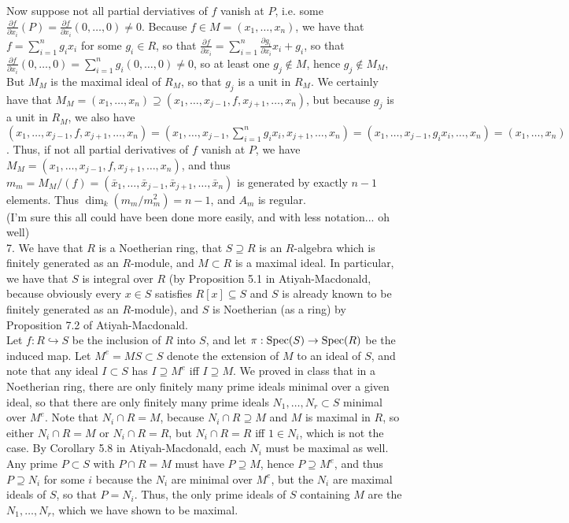 \documentclass[11pt]{article}
\begin{document}
Now suppose not all partial derviatives of $f$ vanish at $P$, i.e. some $\frac{\partial f}{\partial x_i}(P)=\frac{\partial f}{\partial x_i}(0,\ldots,0)\neq0$. Because $f\in M=(x_1,\ldots,x_n)$, we have that $f=\sum_{i=1}^n g_ix_i$ for some $g_i\in R$, so that $\frac{\partial f}{\partial x_i}=\sum_{i=1}^n \frac{\partial g_i}{\partial x_i}x_i + g_i$, so that $\frac{\partial f}{\partial x_i}(0,\ldots,0)=\sum_{i=1}^n g_i(0,\ldots,0)\neq0$, so at least one $g_j\notin M$, hence $g_j\notin M_M$, But $M_M$ is the maximal ideal of $R_M$, so that $g_j$ is a unit in $R_M$. We certainly have that $M_M=(x_1,\ldots,x_n)\supseteq (x_1,\ldots,x_{j-1},f,x_{j+1},\ldots,x_n)$, but because $g_j$ is a unit in $R_M$, we also have $(x_1,\ldots,x_{j-1},f,x_{j+1},\ldots,x_n)=(x_1,\ldots,x_{j-1},\sum_{i=1}^n g_ix_i,x_{j+1},\ldots,x_n)=(x_1,\ldots,x_{j-1},g_ix_i,\ldots,x_n)=(x_1,\ldots,x_n)$. Thus, if not all partial derivatives of $f$ vanish at $P$, we have $M_M=(x_1,\ldots,x_{j-1},f,x_{j+1},\ldots,x_n)$, and thus $m_m=M_M/(f)=(\bar{x}_1,\ldots,\bar{x}_{j-1},\bar{x}_{j+1},\ldots,\bar{x}_n)$ is generated by exactly $n-1$ elements. Thus $\dim_k(m_m/m_m^2)=n-1$, and $A_m$ is regular. \\

(I'm sure this all could have been done more easily, and with less notation... oh well)\\

\num{7.} We have that $R$ is a Noetherian ring, that $S\supseteq R$ is an $R$-algebra which is finitely generated as an $R$-module, and $M\subset R$ is a maximal ideal. In particular, we have that $S$ is integral over $R$ (by Proposition 5.1 in Atiyah-Macdonald, because obviously every $x\in S$ satisfies $R[x]\subseteq S$ and $S$ is already known to be finitely generated as an $R$-module), and $S$ is Noetherian (as a ring) by Proposition 7.2 of Atiyah-Macdonald. \\

Let $f:R\hookrightarrow S$ be the inclusion of $R$ into $S$, and let $\pi:\operatorname{Spec}(S)\rightarrow\operatorname{Spec}(R)$ be the induced map. Let $M^e=MS\subset S$ denote the extension of $M$ to an ideal of $S$, and note that any ideal $I\subset S$ has $I\supseteq M^e$ iff $I\supseteq M$. We proved in class that in a Noetherian ring, there are only finitely many prime ideals minimal over a given ideal, so that there are only finitely many prime ideals $N_1,\ldots,N_r\subset S$ minimal over $M^e$. Note that $N_i\cap R=M$, because $N_i\cap R\supseteq M$ and $M$ is maximal in $R$, so either $N_i\cap R=M$ or $N_i\cap R=R$, but $N_i\cap R=R$ iff $1\in N_i$, which is not the case. By Corollary 5.8 in Atiyah-Macdonald, each $N_i$ must be maximal as well. Any prime $P\subset S$ with $P\cap R=M$ must have $P\supseteq M$, hence $P\supseteq M^e$, and thus $P\supseteq N_i$ for some $i$ because the $N_i$ are minimal over $M^e$, but the $N_i$ are maximal ideals of $S$, so that  $P=N_i$. Thus, the only prime ideals of $S$ containing $M$ are the $N_1,\ldots,N_r$, which we have shown to be maximal.\\
\end{document}
